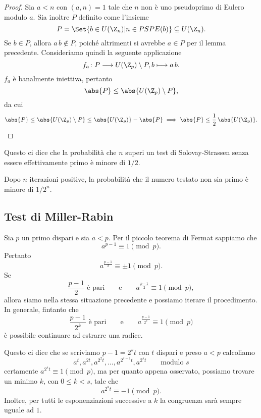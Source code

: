 	\begin{proof}
	Sia \(a<n\) con \((a,n)=1\) tale che \(n\) non è uno pseudoprimo di Eulero modulo \(a\).
	Sia inoltre \(P\) definito come l'insieme
		\[
		P = \Set{b\in U(\Z_n) | n \in PSPE(b)} \subseteq U(\Z_n).
		\]
	Se \(b\in P\), allora \(a\,b\not\in P\), poiché altrimenti si avrebbe \(a \in P\) per il lemma precedente.
	Consideriamo quindi la seguente applicazione
		\[
		f_a \colon P \longrightarrow U(\Z_p) \setminus P, b \longmapsto a\,b.
		\]
	\(f_a\) è banalmente iniettiva, pertanto
		\[
		\abs{P} \le \abs{U(\Z_p) \setminus P},
		\]
	da cui
		\[
		\abs{P} \le \abs{U(\Z_p) \setminus P} \le \abs{U(\Z_p)} - \abs{P} \implies \abs{P} \le \frac{1}{2}\,\abs{U(\Z_p)}.
		\]
	\end{proof}

	\begin{oss}
	Questo ci dice che la probabilità che \(n\) superi un test di Solovay-Strassen senza essere effettivamente primo è minore di \(1/2\).

	Dopo \(n\) iterazioni positive, la probabilità che il numero testato non sia primo è minore di \(1/2^n\).
	\end{oss}
%
%
	\subsection{Test di Miller-Rabin}

	Sia \(p\) un primo dispari e sia \(a<p\). Per il piccolo teorema di Fermat sappiamo che
		\[
		a^{p-1} \equiv 1 \pmod{p}.
		\]
	Pertanto
		\[
		a^{\frac{p-1}{2}} \equiv \pm 1 \pmod{p}.
		\]
	Se
		\[
		\frac{p-1}{2} \text{ è pari} \qquad\text{e}\qquad a^{\frac{p-1}{2}} \equiv 1 \pmod{p},
		\]
	allora siamo nella stessa situazione precedente e possiamo iterare il procedimento.
	In generale, fintanto che
		\[
		\frac{p-1}{2^k} \text{ è pari} \qquad\text{e}\qquad a^{\frac{p-1}{2^k}} \equiv 1 \pmod{p}
		\]
	è possibile continuare ad estrarre una radice.

	Questo ci dice che se scriviamo \(p-1=2^s t\) con \(t\) dispari e preso \(a<p\) calcoliamo
		\[
		a^t, a^{2t}, a^{2^2 t}, \ldots, a^{2^{s-1}t}, a^{2^s t} \qquad\text{modulo }s
		\]
	certamente \(a^{2^s t} \equiv 1 \pmod{p}\), ma per quanto appena osservato, possiamo trovare un minimo \(k\), con \(0\le k < s\), tale che
		\[
		a^{2^k t} \equiv -1 \pmod{p}.
		\]
	Inoltre, per tutti le esponenziazioni successive a \(k\) la congruenza sarà sempre uguale ad \(1\).

